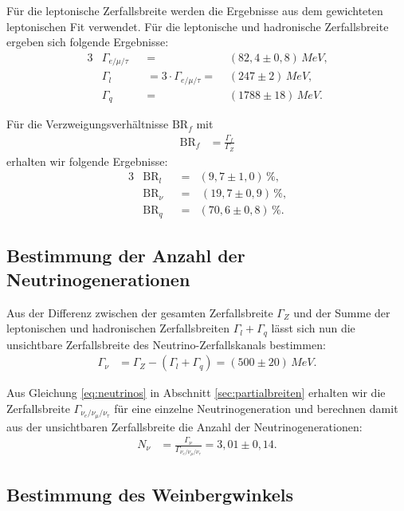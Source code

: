 Für die leptonische Zerfallsbreite werden die Ergebnisse aus dem gewichteten leptonischen Fit verwendet. Für die leptonische und hadronische Zerfallsbreite ergeben sich folgende Ergebnisse:
\begin{alignat}{3}
	&\Gamma_{e/\mu/\tau}&&=&(82,4\pm0,8)\,\si{MeV}\text{,}\\
	&\Gamma_l&&=3\cdot\Gamma_{e/\mu/\tau}=\,\,&(247\pm2)\,\si{MeV}\text{,}\\
	&\Gamma_q&&=&(1788\pm18)\,\si{MeV}\text{.}
\end{alignat}

Für die Verzweigungsverhältnisse $\mathrm{BR}_f$ mit
\begin{align}
	\mathrm{BR}_f&=\frac{\Gamma_f}{\Gamma_Z}
\end{align}
erhalten wir folgende Ergebnisse:
\begin{alignat}{3}
	&\mathrm{BR}_l&&=&(9,7\pm1,0)\,\%\text{,}\\
	&\mathrm{BR}_\nu&&=&\,(19,7\pm0,9)\,\%\text{,}\\
	&\mathrm{BR}_q&&=&(70,6\pm0,8)\,\%\text{.}
\end{alignat}

\subsection{Bestimmung der Anzahl der Neutrinogenerationen}

Aus der Differenz zwischen der gesamten Zerfallsbreite $\Gamma_Z$ und der Summe der leptonischen und hadronischen Zerfallsbreiten $\Gamma_l+\Gamma_q$ lässt sich nun die unsichtbare Zerfallsbreite des Neutrino-Zerfallskanals bestimmen:
\begin{align}
	\Gamma_\nu&=\Gamma_Z-\left(\Gamma_l+\Gamma_q\right)=(500\pm20)\,\si{MeV}\text{.}
\end{align}

Aus Gleichung \ref{eq:neutrinos} in Abschnitt \ref{sec:partialbreiten} erhalten wir die Zerfallsbreite $\Gamma_{\nu_e/\nu_\mu/\nu_\tau}$ für eine einzelne Neutrinogeneration und berechnen damit aus der unsichtbaren Zerfallsbreite die Anzahl der Neutrinogenerationen:
\begin{align}
	N_\nu&=\frac{\Gamma_\nu}{\Gamma_{\nu_e/\nu_\mu/\nu_\tau}}=3,01\pm0,14\text{.}
\end{align}

\subsection{Bestimmung des Weinbergwinkels}

